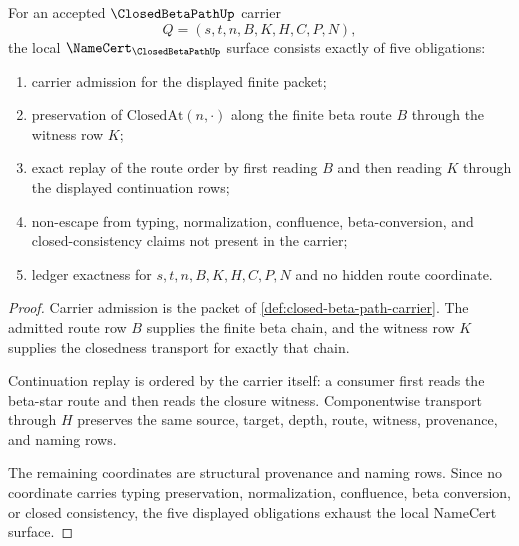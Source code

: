 \begin{theorem}
\label{thm:closed-beta-path-namecert-obligations}
For an accepted $\ClosedBetaPathUp$ carrier
$$
Q=(s,t,n,B,K,H,C,P,N),
$$
the local $\NameCert_{\ClosedBetaPathUp}$ surface consists exactly of five
obligations:
\begin{enumerate}
\item carrier admission for the displayed finite packet;
\item preservation of $\mathrm{ClosedAt}(n,\cdot)$ along the finite beta route
$B$ through the witness row $K$;
\item exact replay of the route order by first reading $B$ and then reading
$K$ through the displayed continuation rows;
\item non-escape from typing, normalization, confluence, beta-conversion, and
closed-consistency claims not present in the carrier;
\item ledger exactness for $s,t,n,B,K,H,C,P,N$ and no hidden route coordinate.
\end{enumerate}
\end{theorem}
\begin{proof}
Carrier admission is the packet of
\autoref{def:closed-beta-path-carrier}. The admitted route row $B$ supplies the
finite beta chain, and the witness row $K$ supplies the closedness transport
for exactly that chain.

Continuation replay is ordered by the carrier itself: a consumer first reads
the beta-star route and then reads the closure witness. Componentwise
transport through $H$ preserves the same source, target, depth, route, witness,
provenance, and naming rows.

The remaining coordinates are structural provenance and naming rows. Since no
coordinate carries typing preservation, normalization, confluence, beta
conversion, or closed consistency, the five displayed obligations exhaust the
local NameCert surface.
\end{proof}

